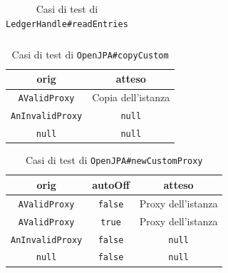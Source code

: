\documentclass[10pt]{article}
\begin{document}
{\begin{table}[h]
\begin{tabular}{|c|c|c|c|c|}
			\end{tabular}
			\caption{Casi di test di \texttt{LedgerHandle\#readEntries}}
			\label{tab:readEntriesLedger}
		\end{table}
		
		
		\begin{table}[h]
			\centering
			\begin{tabular}{|c|c|}
				\hline
				\textbf{orig} & \textbf{atteso} \\
				\hline
				\texttt{AValidProxy} & Copia dell'istanza \\
				\hline
				\texttt{AnInvalidProxy} & \texttt{null} \\
				\hline
				\texttt{null} & \texttt{null} \\
				\hline
			\end{tabular}
			\caption{Casi di test di \texttt{OpenJPA\#copyCustom}}
			\label{tab:test5}
		\end{table}
		
		
		\begin{table}[h]
			\centering
			\begin{tabular}{|c|c|c|}
				\hline
				\textbf{orig} & \textbf{autoOff} & \textbf{atteso} \\
				\hline
				\texttt{AValidProxy} & \texttt{false} & Proxy dell'istanza \\
				\hline
				\texttt{AValidProxy} & \texttt{true} & Proxy dell'istanza \\
				\hline
				\texttt{AnInvalidProxy} & \texttt{false} & \texttt{null} \\
				\hline
				\texttt{null} & \texttt{false} & \texttt{null} \\
				\hline
			\end{tabular}
			\caption{Casi di test di \texttt{OpenJPA\#newCustomProxy}}
			\label{tab:test5}
		\end{table}
		
}
\end{document}
